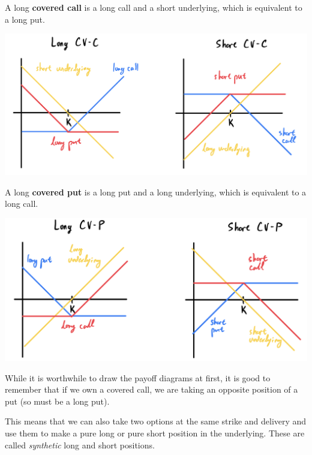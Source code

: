 \documentclass{article}
\begin{document}
    \begin{definition}
      A long \textbf{covered call} is a long call and a short underlying, which is equivalent to a long put. 
      \begin{center}
        \includegraphics[scale=0.3]{img/covered_call.png}
      \end{center}
    \end{definition}

    \begin{definition}
      A long \textbf{covered put} is a long put and a long underlying, which is equivalent to a long call. 
      \begin{center}
        \includegraphics[scale=0.3]{img/covered_put.png}
      \end{center}
    \end{definition}

    While it is worthwhile to draw the payoff diagrams at first, it is good to remember that if we own a covered call, we are taking an opposite position of a put (so must be a long put). 

    This means that we can also take two options at the same strike and delivery and use them to make a pure long or pure short position in the underlying. These are called \textit{synthetic} long and short positions. 
\end{document}
